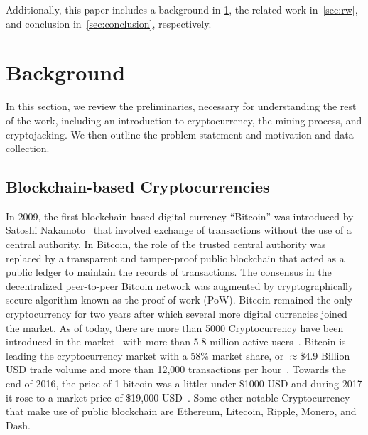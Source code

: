 \documentclass[acmlarge]{acmart}
\newcommand{\cc}{{cryptocurrency}\xspace}
\newcommand{\Cc}{{Cryptocurrency}\xspace}
\newcommand{\cj}{cryptojacking\xspace}
\begin{document}
Additionally, this paper includes a background in \textsection\ref{sec:background}, the related work in~\textsection\ref{sec:rw}, and conclusion in~\textsection\ref{sec:conclusion}, respectively. 


\section{Background}\label{sec:background}
In this section, we review the preliminaries, necessary for understanding the rest of the work, including an introduction to \cc, the mining process, and \cj. We then outline the problem statement and motivation and data collection. 



\subsection{Blockchain-based Cryptocurrencies}\label{sec:cryptos}
In 2009, the first blockchain-based digital currency ``Bitcoin'' was introduced by Satoshi Nakamoto~\cite{nakamoto2008bitcoin} that involved exchange of transactions without the use of a central authority. In Bitcoin, the role of the trusted central authority was replaced by a transparent and tamper-proof public blockchain that acted as a public ledger to maintain the records of transactions.  The consensus in the decentralized peer-to-peer Bitcoin network was augmented by cryptographically secure algorithm known as the proof-of-work (PoW). Bitcoin remained the only \cc for two years after which several more digital currencies joined the market. As of today, there are more than 5000 \Cc have been introduced in the market~\cite{atozforex} with more than 5.8 million active users~\cite{hileman2017global}. Bitcoin is leading the \cc market with a 58\% market share, or $\approx$\$4.9 Billion USD trade volume and more than 12,000 transactions per hour~\cite{bitcoinnews_2017}. 
Towards the end of 2016, the price of 1 bitcoin was a littler under \$1000 USD and during 2017 it rose to a market price of \$19,000 USD~\cite{blockexplorer}. Some other notable \Cc that make use of public blockchain are Ethereum, Litecoin, Ripple, Monero, and Dash. 
\end{document}
